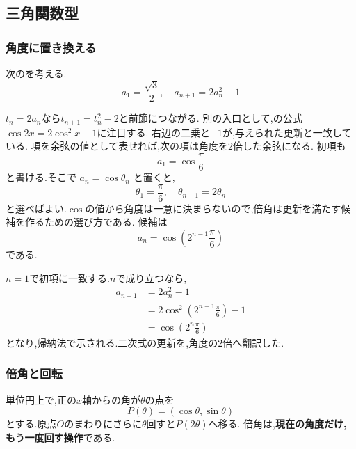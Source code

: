 \subsection{三角関数型}\label{節：三角関数型}
\subsubsection{角度に置き換える}\label{節：角度に置き換える}
次のを考える.
\[
  a_1=\frac{\sqrt{3}}{2},\quad a_{n+1}=2a_n^2-1
\]

$t_n=2a_n$なら$t_{n+1}=t_n^2-2$と前節につながる.
別の入口として,の公式$\cos2x=2\cos^2x-1$に注目する.
右辺の二乗と$-1$が,与えられた更新と一致している.
項を余弦の値として表せれば,次の項は角度を2倍した余弦になる.
初項も
\[
  a_1=\cos\frac{\pi}{6}
\]
と書ける.そこで $a_n=\cos\theta_n$ と置くと,
\[
  \theta_1=\frac{\pi}{6},
  \quad
  \theta_{n+1}=2\theta_n
\]
と選べばよい.$\cos$の値から角度は一意に決まらないので,倍角は更新を満たす候補を作るための選び方である.
候補は
\[
  a_n=\cos\left(2^{n-1}\frac{\pi}{6}\right)
\]
である.

$n=1$で初項に一致する.$n$で成り立つなら,
\begin{align*}
  a_{n+1}
  &=2a_n^2-1\\
  &=2\cos^2\left(2^{n-1}\frac{\pi}{6}\right)-1\\
  &=\cos\left(2^n\frac{\pi}{6}\right)
\end{align*}
となり,帰納法で示される.二次式の更新を,角度の2倍へ翻訳した.

\subsubsection{倍角と回転}\label{節：倍角と回転}
単位円上で,正の$x$軸からの角が$\theta$の点を
\[
  P(\theta)=(\cos\theta,\sin\theta)
\]
とする.原点$O$のまわりにさらに$\theta$回すと$P(2\theta)$へ移る.
倍角は,\textbf{現在の角度だけ,もう一度回す操作}である.

\begin{center}
\end{center}

